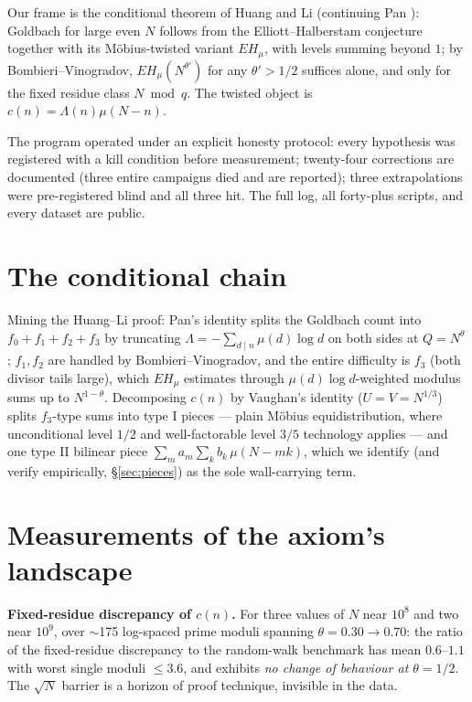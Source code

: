 \documentclass[11pt]{article}
\theoremstyle{definition}
\begin{document}
Our frame is the conditional theorem of Huang and Li \cite{HL}
(continuing Pan \cite{Pan}): Goldbach for large even $N$ follows from
the Elliott--Halberstam conjecture together with its M\"obius-twisted
variant $EH_\mu$, with levels summing beyond $1$; by
Bombieri--Vinogradov, $EH_\mu(N^{\theta'})$ for any $\theta' > 1/2$
suffices alone, and only for the fixed residue class $N \bmod q$. The
twisted object is $c(n) = \Lambda(n)\mu(N-n)$.

The program operated under an explicit honesty protocol: every
hypothesis was registered with a kill condition before measurement;
twenty-four corrections are documented (three entire campaigns died and
are reported); three extrapolations were pre-registered blind and all
three hit. The full log, all forty-plus scripts, and every dataset are
public.

\section{The conditional chain}

Mining the Huang--Li proof: Pan's identity splits the Goldbach count
into $f_0 + f_1 + f_2 + f_3$ by truncating $\Lambda = -\sum_{d\mid n}
\mu(d)\log d$ on both sides at $Q = N^\theta$; $f_1, f_2$ are handled by
Bombieri--Vinogradov, and the entire difficulty is $f_3$ (both divisor
tails large), which $EH_\mu$ estimates through $\mu(d)\log d$-weighted
modulus sums up to $N^{1-\theta}$. Decomposing $c(n)$ by Vaughan's
identity ($U = V = N^{1/3}$) splits $f_3$-type sums into type I pieces
--- plain M\"obius equidistribution, where unconditional level $1/2$
and well-factorable level $3/5$ technology applies --- and one type II
bilinear piece $\sum_m a_m \sum_k b_k\, \mu(N - mk)$, which we identify
(and verify empirically, \S\ref{sec:pieces}) as the sole wall-carrying
term.

\section{Measurements of the axiom's landscape}\label{sec:land}

\textbf{Fixed-residue discrepancy of $c(n)$.} For three values of $N$
near $10^8$ and two near $10^9$, over $\sim$175 log-spaced prime moduli
spanning $\theta = 0.30 \to 0.70$: the ratio of the fixed-residue
discrepancy to the random-walk benchmark has mean $0.6$--$1.1$ with
worst single moduli $\le 3.6$, and exhibits \emph{no change of behaviour
at $\theta = 1/2$}. The $\sqrt N$ barrier is a horizon of proof
technique, invisible in the data.
\end{document}
